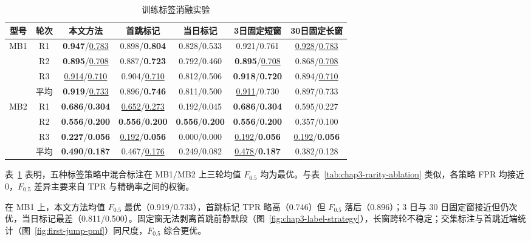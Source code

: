 \begin{table}[htbp]
    \centering
    \caption{\label{tab:chap3-label-ablation}训练标签消融实验}

    \setlength{\tabcolsep}{4pt}
    \begin{tabular*}{\linewidth}{@{\extracolsep{\fill}} c c *{5}{c} @{}}
        \toprule
        型号 & 轮次 & 本文方法 & 首跳标记 & 当日标记 & 3日固定短窗 & 30日固定长窗 \\
        \midrule
        \multirow{4}{*}{MB1}
        & R1 & \textbf{0.947}/\underline{0.783} & 0.898/\textbf{0.804} & 0.828/0.533 & 0.921/0.761 & \underline{0.928}/\underline{0.783} \\
        & R2 & \textbf{0.895}/\underline{0.708} & 0.887/\textbf{0.723} & 0.792/0.460 & \textbf{0.895}/\underline{0.708} & 0.868/\underline{0.708} \\
        & R3 & \underline{0.914}/\underline{0.710} & 0.904/\underline{0.710} & 0.812/0.506 & \textbf{0.918}/\textbf{0.720} & 0.894/\underline{0.710} \\
        & 平均 & \textbf{0.919}/\underline{0.733} & 0.896/\textbf{0.746} & 0.811/0.500 & \underline{0.911}/0.730 & 0.897/0.733 \\

        \midrule
        \multirow{4}{*}{MB2}
        & R1 & \textbf{0.686}/\textbf{0.304} & \underline{0.652}/\underline{0.273} & 0.192/0.045 & \textbf{0.686}/\textbf{0.304} & 0.595/0.227 \\
        & R2 & \textbf{0.556}/\textbf{0.200} & \textbf{0.556}/\textbf{0.200} & \textbf{0.556}/\textbf{0.200} & \textbf{0.556}/\textbf{0.200} & 0.357/0.100 \\
        & R3 & \textbf{0.227}/\textbf{0.056} & \underline{0.192}/\textbf{0.056} & 0.000/0.000 & \underline{0.192}/\textbf{0.056} & \underline{0.192}/\textbf{0.056} \\
        & 平均 & \textbf{0.490}/\textbf{0.187} & 0.467/\underline{0.176} & 0.249/0.082 & \underline{0.478}/\textbf{0.187} & 0.382/0.128 \\
        \bottomrule
    \end{tabular*}
\end{table}

表~\ref{tab:chap3-label-ablation} 表明，五种标签策略中混合标注在 MB1/MB2 上三轮均值 $F_{0.5}$ 均为最优。与表~\ref{tab:chap3-rarity-ablation} 类似，各策略 FPR 均接近 0，$F_{0.5}$ 差异主要来自 TPR 与精确率之间的权衡。

在 MB1 上，本文方法均值 $F_{0.5}$ 最优（0.919/0.733），首跳标记 TPR 略高（0.746）但 $F_{0.5}$ 落后（0.896）；3 日与 30 日固定窗接近但仍次优，当日标记最差（0.811/0.500）。固定窗无法剥离首跳前静默段（图~\ref{fig:chap3-label-strategy}），长窗跨轮不稳定；交集标注与首跳近端统计（图~\ref{fig:first-jump-pmf}）同尺度，$F_{0.5}$ 综合更优。

